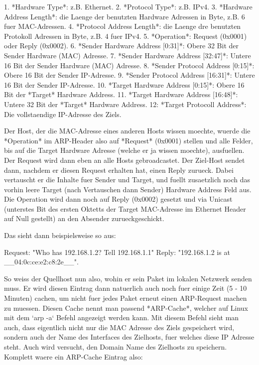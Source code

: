 1. *Hardware Type*: z.B. Ethernet.
2. *Protocol Type*: z.B. IPv4.
3. *Hardware Address Length*: die Laenge der benutzten Hardware Adressen in
   Byte, z.B. 6 fuer MAC-Adressen.
4. *Protocol Address Length*: die Laenge dre benutzten Protokoll Adressen in
   Byte, z.B. 4 fuer IPv4.
5. *Operation*: Request (0x0001) oder Reply (0x0002).
6. *Sender Hardware Address [0:31]*: Obere 32 Bit der Sender Hardware (MAC) Adresse.
7. *Sender Hardware Address [32:47]*: Untere 16 Bit der Sender Hardware (MAC) Adresse.
8. *Sender Protocol Address [0:15]*: Obere 16 Bit der Sender IP-Adresse.
9. *Sender Protocol Address [16:31]*: Untere 16 Bit der Sender IP-Adresse.
10. *Target Hardware Address [0:15]*: Obere 16 Bit der *Target* Hardware
    Address.
11. *Target Hardware Address [16:48]*: Untere 32 Bit der *Target* Hardware
    Address.
12: *Target Protocoll Address*: Die vollstaendige IP-Adresse des Ziels.

Der Host, der die MAC-Adresse eines anderen Hosts wissen moechte, wuerde die
*Operation* im ARP-Header also auf *Request* (0x0001) stellen und alle Felder,
bis auf die Target Hardware Adresse (welche er ja wissen moechte),
ausfuellen. Der Request wird dann eben an alle Hosts gebroadcastet. Der
Ziel-Host sendet dann, nachdem er diesen Request erhalten hat, einen Reply
zurueck. Dabei vertauscht er die Inhalte fuer Sender und Target, und fuellt
zusaetzlich noch das vorhin leere Target (nach Vertauschen dann Sender) Hardware
Address Feld aus. Die Operation wird dann noch auf Reply (0x0002) gesetzt und
via Unicast (unterstes Bit des ersten Oktetts der Target MAC-Adresse im Ethernet
Header auf Null gestellt) an den Absender zurueckgeschickt.

Das sieht dann beispielsweise so aus:

Request: "Who has 192.168.1.2? Tell 192.168.1.1"
Reply: "192.168.1.2 is at \_\_04:0c:ce:e2:c8:2e\_\_".

So weiss der Quellhost nun also, wohin er sein Paket im lokalen Netzwerk senden
muss. Er wird diesen Eintrag dann natuerlich auch noch fuer einige Zeit (5 - 10
Minuten) cachen, um nicht fuer jedes Paket erneut einen ARP-Request machen zu
muessen. Diesen Cache nennt man passend *ARP-Cache*, welcher auf Linux mit dem
`arp -a` Befehl angezeigt werden kann. Mit diesem Befehl sieht man auch, dass
eigentlich nicht nur die MAC Adresse des Ziels gespeichert wird, sondern auch
der Name des Interfaces des Zielhosts, fuer welches diese IP Adresse steht. Auch
wird versucht, den Domain Name des Zielhosts zu speichern. Komplett waere ein
ARP-Cache Eintrag also:

